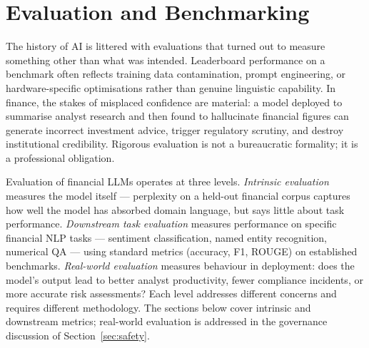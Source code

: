 
\section{Evaluation and Benchmarking}
\label{sec:evaluation}

\begin{context}
The history of AI is littered with evaluations that turned out to measure
something other than what was intended.  Leaderboard performance on a benchmark
often reflects training data contamination, prompt engineering, or
hardware-specific optimisations rather than genuine linguistic capability.
In finance, the stakes of misplaced confidence are material: a model deployed
to summarise analyst research and then found to hallucinate financial figures
can generate incorrect investment advice, trigger regulatory scrutiny, and
destroy institutional credibility.  Rigorous evaluation is not a bureaucratic
formality; it is a professional obligation.

Evaluation of financial LLMs operates at three levels.  \emph{Intrinsic
evaluation} measures the model itself --- perplexity on a held-out financial
corpus captures how well the model has absorbed domain language, but says
little about task performance.  \emph{Downstream task evaluation} measures
performance on specific financial NLP tasks --- sentiment classification,
named entity recognition, numerical QA --- using standard metrics (accuracy,
F1, ROUGE) on established benchmarks.  \emph{Real-world evaluation} measures
behaviour in deployment: does the model's output lead to better analyst
productivity, fewer compliance incidents, or more accurate risk assessments?
Each level addresses different concerns and requires different methodology.
The sections below cover intrinsic and downstream metrics; real-world evaluation
is addressed in the governance discussion of Section~\ref{sec:safety}.
\end{context}


